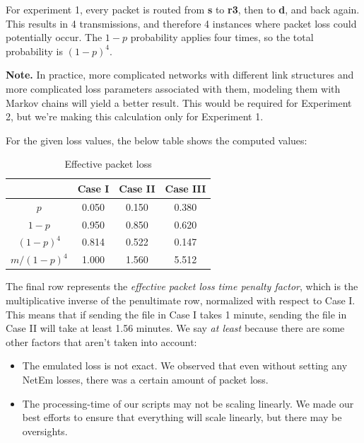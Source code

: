 \documentclass[conference]{IEEEtran}
\begin{document}
For experiment 1, every packet is routed from \textbf{s} to \textbf{r3}, then to \textbf{d}, and
back again. This results in 4 transmissions, and therefore 4 instances where packet loss could
potentially occur. The $1-p$ probability applies four times, so the total probability is
$(1-p)^4$.

\textbf{Note.} In practice, more complicated networks with different link structures and more
complicated loss parameters associated with them, modeling them with Markov chains will yield
a better result. This would be required for Experiment 2, but we're making this calculation only
for Experiment 1.

For the given loss values, the below table shows the computed values:

\begin{table}[h]
    \centering
    \renewcommand{\arraystretch}{2.5}
        \begin{tabular}{|c|c|c|c|}
        \hline
                            & Case I & Case II & Case III \\
        \hline
                $p$         & 0.050  & 0.150   & 0.380    \\
        \hline
                $1-p$       & 0.950  & 0.850   & 0.620    \\
        \hline
                $(1-p)^4$   & 0.814  & 0.522   & 0.147    \\
        \hline
                $m/(1-p)^4$ & 1.000  & 1.560   & 5.512    \\
        \hline
        \end{tabular}
    \caption{Effective packet loss}
    \label{table:theoretical}
\end{table}

The final row represents the \textit{effective packet loss time penalty factor}, which is the
multiplicative inverse of the penultimate row, normalized with respect to Case I. This means that
if sending the file in Case I takes 1 minute, sending the file in Case II will take at least
1.56 minutes. We say \textit{at least} because there are some other factors that aren't taken into
account:

\begin{itemize}
    \item The emulated loss is not exact. We observed that even without setting any NetEm losses,
    there was a certain amount of packet loss.
    \item The processing-time of our scripts may not be scaling linearly. We made our best efforts
    to ensure that everything will scale linearly, but there may be oversights.
\end{itemize}
\end{document}
